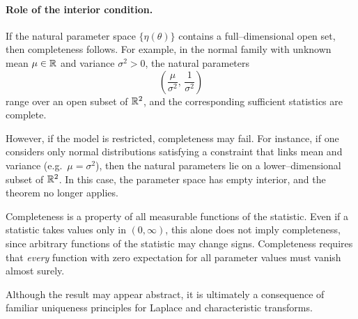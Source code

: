 \paragraph{Role of the interior condition.}
If the natural parameter space \(\{\eta(\theta)\}\) contains a full--dimensional open set, then completeness follows.
For example, in the normal family with unknown mean \(\mu\in\mathbb{R}\) and variance \(\sigma^{2}>0\), the natural parameters
\[
\left(\frac{\mu}{\sigma^{2}},\,\frac{1}{\sigma^{2}}\right)
\]
range over an open subset of \(\mathbb{R}^{2}\), and the corresponding sufficient statistics are complete.

However, if the model is restricted, completeness may fail.
For instance, if one considers only normal distributions satisfying a constraint that links mean and variance (e.g.\ \(\mu=\sigma^{2}\)), then the natural parameters lie on a lower--dimensional subset of \(\mathbb{R}^{2}\).
In this case, the parameter space has empty interior, and the theorem no longer applies.

\begin{remark}[]
Completeness is a property of all measurable functions of the statistic.
Even if a statistic takes values only in \((0,\infty)\), this alone does not imply completeness, since arbitrary functions of the statistic may change signs.
Completeness requires that \emph{every} function with zero expectation for all parameter values must vanish almost surely.
\end{remark}

\medskip
Although the result may appear abstract, it is ultimately a consequence of familiar uniqueness principles for Laplace and characteristic transforms.

